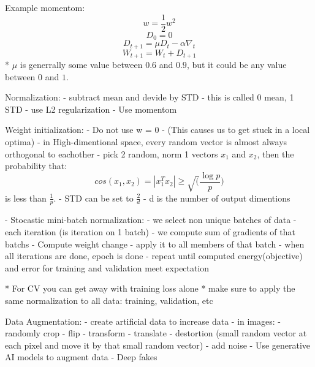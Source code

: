 Example momentom:
\[w = \frac{1}{2}w^2\]
\[D_0 = 0\]
\[D_{t+1} = \mu D_t - \alpha \nabla_t\]
\[W_{t+1} = W_t + D_{t+1}\]
* $\mu$ is generrally some value between $0.6$ and $0.9$, but it could be any value between $0$ and $1$.

Normalization:
- subtract mean and devide by STD
 - this is called 0 mean, 1 STD
- use L2 regularization
- Use momentom

Weight initialization:
- Do not use w = 0
 - (This causes us to get stuck in a local optima)
- in High-dimentional space, every random vector is almost always orthogonal to eachother
- pick 2 random, norm 1 vectors $x_1$ and $x_2$, then the probability that:
\[cos(x_1,x_2) = |x^T_1x_2|\geq \sqrt(\frac{\log p}{p})\]
  is less than $\frac{1}{p}$.
- STD can be set to $\frac{2}{d}$
 - d is the number of output dimentions

- Stocastic mini-batch normalization:
 - we select non unique batches of data
 - each iteration (is iteration on 1 batch)
  - we compute sum of gradients of that batchs
  - Compute weight change
  - apply it to all members of that batch
  - when all iterations are done, epoch is done
 - repeat until computed energy(objective) and error for training and validation meet expectation

* For CV you can get away with training loss alone
* make sure to apply the same normalization to all data: training, validation, etc

Data Augmentation:
- create artificial data to increase data
 - in images:
  - randomly crop
  - flip
  - transform
  - translate
  - destortion (small random vector at each pixel and move it by that small random vector)
  - add noise
  - Use generative AI models to augment data
   - Deep fakes
